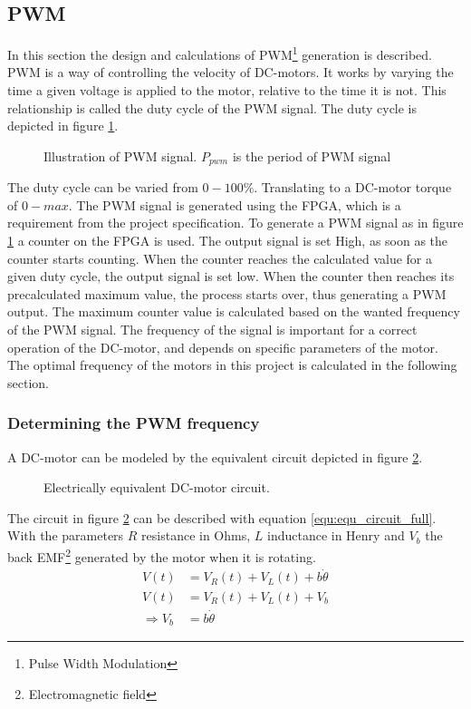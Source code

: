 \documentclass[../../../Main]{subfiles}
\begin{document}
\subsection{PWM}
In this section the design  and calculations of PWM\footnote{Pulse Width Modulation} generation is described. PWM is a way of controlling the velocity of DC-motors. It works by varying the time a given voltage is applied to the motor, relative to the time it is not. This relationship is called the duty cycle of the PWM signal. The duty cycle is depicted in figure \ref{fig:pwm}.

\begin{figure}[h]
  
  \caption{Illustration of PWM signal. $P_{pwm}$ is the period of PWM signal}
  \label{fig:pwm}
\end{figure}

The duty cycle can be varied from $0 - 100\%$. Translating to a DC-motor torque of $0 - max$.
The PWM signal is generated using the FPGA, which is a requirement from the project specification. To generate a PWM signal as in figure \ref{fig:pwm} a counter on the FPGA  is used.
The output signal is set High, as soon as the counter starts counting. When the counter reaches the calculated value for a given duty cycle, the output signal is set low. When the counter then reaches its precalculated maximum value, the process starts over, thus generating a PWM output. The maximum counter value is calculated based on the wanted frequency of the PWM signal. The frequency of the signal is important for a correct operation of the DC-motor, and depends on specific parameters of the motor. The optimal frequency of the motors in this project is calculated in the following section.

\subsubsection{Determining the PWM frequency}

A DC-motor can be modeled by the equivalent circuit depicted in figure \ref{fig:electrical_equ}.

\begin{figure}[ht]
	\center
    \def\svgwidth{0.5\textwidth}
	
	\caption{Electrically equivalent DC-motor circuit.}
  \label{fig:electrical_equ}
\end{figure}
The circuit in figure \ref{fig:electrical_equ} can be described with equation \eqref{equ:equ_circuit_full}. With the parameters $R$ resistance in Ohms, $L$ inductance in Henry and $V_b$ the back EMF\footnote{Electromagnetic field} generated by the motor when it is rotating.
\begin{align}
	V(t) &= V_R(t) + V_L(t) + b\dot{\theta}\\
 \label{equ:equ_circuit_full}
	V(t) &= V_R(t) + V_L(t) + V_b\\
	\Rightarrow V_b &= b\dot{\theta}
\end{align}
\end{document}
